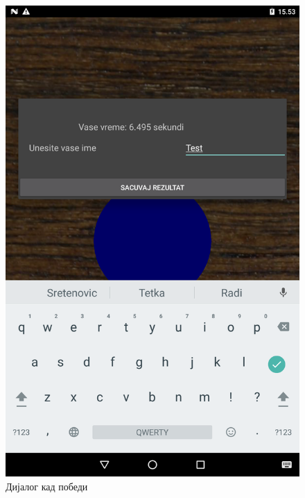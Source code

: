 \begin{figure}[htb!]
\begin{center}
\includegraphics[scale=.1]{pictures/game/gameWon}
\caption{Дијалог кад победи}\label{fig:gameGameWon}
\end{center}
\end{figure}


